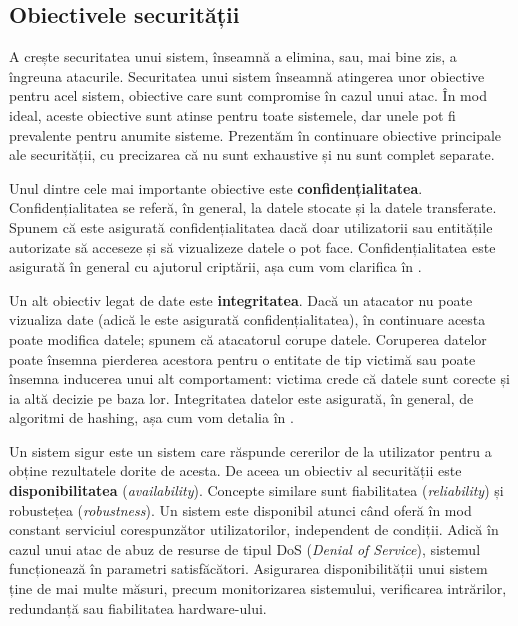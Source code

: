 \subsection{Obiectivele securității}
\label{sec:sec:fundamentals:objectives}

A crește securitatea unui sistem, înseamnă a elimina, sau, mai bine zis, a îngreuna atacurile.
Securitatea unui sistem înseamnă atingerea unor obiective pentru acel sistem, obiective care sunt compromise în cazul unui atac.
În mod ideal, aceste obiective sunt atinse pentru toate sistemele, dar unele pot fi prevalente pentru anumite sisteme.
Prezentăm în continuare obiective principale ale securității, cu precizarea că nu sunt exhaustive și nu sunt complet separate.

Unul dintre cele mai importante obiective este \textbf{confidențialitatea}.
Confidențialitatea se referă, în general, la datele stocate și la datele transferate.
Spunem că este asigurată confidențialitatea dacă doar utilizatorii sau entitățile autorizate să acceseze și să vizualizeze datele o pot face.
Confidențialitatea este asigurată în general cu ajutorul criptării, așa cum vom clarifica în .

Un alt obiectiv legat de date este \textbf{integritatea}.
Dacă un atacator nu poate vizualiza date (adică le este asigurată confidențialitatea), în continuare acesta poate modifica datele;
spunem că atacatorul corupe datele.
Coruperea datelor poate însemna pierderea acestora pentru o entitate de tip victimă sau poate însemna inducerea unui alt comportament: victima crede că datele sunt corecte și ia altă decizie pe baza lor.
Integritatea datelor este asigurată, în general, de algoritmi de hashing, așa cum vom detalia în .

Un sistem sigur este un sistem care răspunde cererilor de la utilizator pentru a obține rezultatele dorite de acesta.
De aceea un obiectiv al securității este \textbf{disponibilitatea} (\textit{availability}).
Concepte similare sunt fiabilitatea (\textit{reliability}) și robustețea (\textit{robustness}).
Un sistem este disponibil atunci când oferă în mod constant serviciul corespunzător utilizatorilor, independent de condiții.
Adică în cazul unui atac de abuz de resurse de tipul DoS (\textit{Denial of Service}), sistemul funcționează în parametri satisfăcători.
Asigurarea disponibilității unui sistem ține de mai multe măsuri, precum monitorizarea sistemului, verificarea intrărilor, redundanță sau fiabilitatea hardware-ului.

